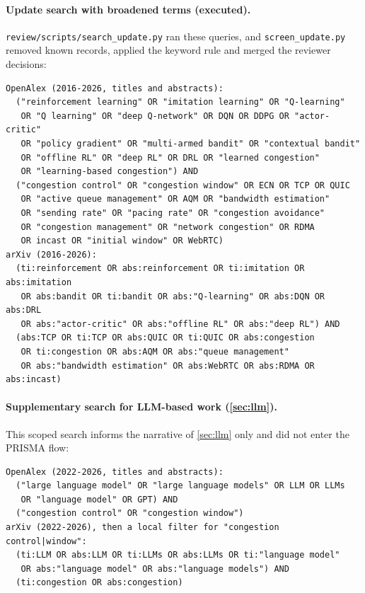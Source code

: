 \paragraph{Update search with broadened terms (executed).} \texttt{review/scripts/search\_update.py} ran these queries, and \texttt{screen\_update.py} removed known records, applied the keyword rule and merged the reviewer decisions:
\begin{small}
\begin{verbatim}
OpenAlex (2016-2026, titles and abstracts):
  ("reinforcement learning" OR "imitation learning" OR "Q-learning"
   OR "Q learning" OR "deep Q-network" OR DQN OR DDPG OR "actor-critic"
   OR "policy gradient" OR "multi-armed bandit" OR "contextual bandit"
   OR "offline RL" OR "deep RL" OR DRL OR "learned congestion"
   OR "learning-based congestion") AND
  ("congestion control" OR "congestion window" OR ECN OR TCP OR QUIC
   OR "active queue management" OR AQM OR "bandwidth estimation"
   OR "sending rate" OR "pacing rate" OR "congestion avoidance"
   OR "congestion management" OR "network congestion" OR RDMA
   OR incast OR "initial window" OR WebRTC)
arXiv (2016-2026):
  (ti:reinforcement OR abs:reinforcement OR ti:imitation OR abs:imitation
   OR abs:bandit OR ti:bandit OR abs:"Q-learning" OR abs:DQN OR abs:DRL
   OR abs:"actor-critic" OR abs:"offline RL" OR abs:"deep RL") AND
  (abs:TCP OR ti:TCP OR abs:QUIC OR ti:QUIC OR abs:congestion
   OR ti:congestion OR abs:AQM OR abs:"queue management"
   OR abs:"bandwidth estimation" OR abs:WebRTC OR abs:RDMA OR abs:incast)
\end{verbatim}
\end{small}

\paragraph{Supplementary search for LLM-based work (\cref{sec:llm}).} This scoped search informs the narrative of \cref{sec:llm} only and did not enter the PRISMA flow:
\begin{small}
\begin{verbatim}
OpenAlex (2022-2026, titles and abstracts):
  ("large language model" OR "large language models" OR LLM OR LLMs
   OR "language model" OR GPT) AND
  ("congestion control" OR "congestion window")
arXiv (2022-2026), then a local filter for "congestion control|window":
  (ti:LLM OR abs:LLM OR ti:LLMs OR abs:LLMs OR ti:"language model"
   OR abs:"language model" OR abs:"language models") AND
  (ti:congestion OR abs:congestion)
\end{verbatim}
\end{small}

